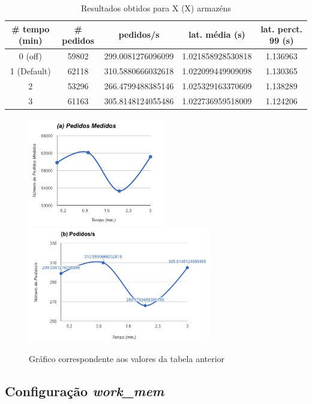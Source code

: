 \begin{table}[!h]
\center
\small
\begin{tabular}{|c|c|c|c|c|}
\hline
\textbf{\# tempo (min)} & \textbf{\# pedidos} & \textbf{pedidos/s} & \textbf{lat. média (s)} & \textbf{lat. perct. 99 (s)}  \\ \hline
0 (off) & 59802 & 299.0081276096099 & 1.021858928530818 & 1.136963  \\ \hline
1 (Default) & 62118 & 310.5880666032618 & 1.022099449909098 & 1.130365  \\ \hline
2 & 53296 & 266.4799488385146 & 1.025329163370609 & 1.138289  \\ \hline
3 & 61163 & 305.8148124055486 & 1.022736959518009 & 1.124206  \\ \hline
\end{tabular}
\caption{Resultados obtidos para X (X) armazéns}
\end{table}

\begin{figure}[ht!]
\centering
\includegraphics[width=60mm]{img/05_vacuum_a.png}
\includegraphics[width=80mm]{img/05_vacuum_b.png}
\caption{Gráfico correspondente aos valores da tabela anterior\label{overflow}}
\end{figure}


\subsection{Configuração \textit{work\_mem}}

